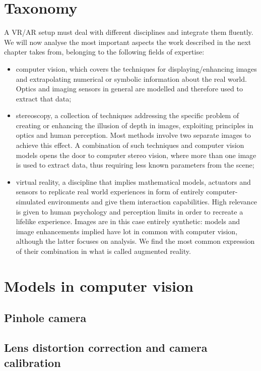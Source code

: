 \section{Taxonomy}

A VR/AR setup must deal with different disciplines and integrate them fluently. We will now analyse the most important aspects the work described in the next chapter takes from, belonging to the following fields of expertise:
\begin{itemize}
\item
computer vision, which covers the techniques for displaying/enhancing images and extrapolating numerical or symbolic information about the real world. Optics and imaging sensors in general are modelled and therefore used to extract that data;
\item
stereoscopy, a collection of techniques addressing the specific problem of creating or enhancing the illusion of depth in images, exploiting principles in optics and human perception. Most methods involve two separate images to achieve this effect. A combination of such techniques and computer vision models opens the door to computer stereo vision, where more than one image is used to extract data, thus requiring less known parameters from the scene;
\item
virtual reality, a discipline that implies mathematical models, actuators and sensors to replicate real world experiences in form of entirely computer-simulated environments and give them interaction capabilities. High relevance is given to human psychology and perception limits in order to recreate a lifelike experience. Images are in this case entirely synthetic: models and image enhancements implied have lot in common with computer vision, although the latter focuses on analysis. We find the most common expression of their combination in what is called augmented reality.
\end{itemize}

\section{Models in computer vision}

\subsection{Pinhole camera}

\subsection{Lens distortion correction and camera calibration}

